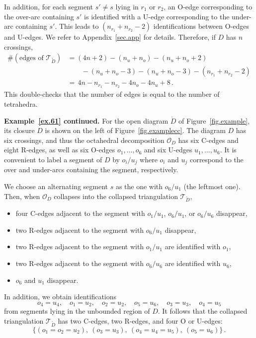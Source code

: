 \documentclass[12pt,reqno]{amsart}
\theoremstyle{definition}
\def\calO{\mathcal O}
\def\calT{\mathcal T}
\renewcommand{\Ddot}{\mathring{D}}
\begin{document}
In addition, for each segment $s' \neq s$ lying in $r_1$ or $r_2$, an O-edge
corresponding to the over-arc containing $s'$ is identified with a U-edge
corresponding to the under-arc containing $s'$. This leads to
$(n_{r_1}+n_{r_2}-2)$ identifications between O-edges and U-edges. 
We refer to Appendix~\ref{sec.app} for details.  Therefore, if $D$ has $n$
crossings, 
\begin{align*}
\# ( \textrm{edges of } \calT_{\Ddot}) &= (4n + 2) - (n_u + n_o) - (n_u + n_o +2) \\
 & \quad \quad - (n_u + n _o -3) - (n_u + n _o -3) - (n_{r_1} + n_{r_2} -2 ) \\
&=  \, 4n  - n_{r_1} - n_{r_2}-4n_o -4n_u + 8 \, .
\end{align*}
This double-checks that the number of edges is equal to the number of tetrahedra.

\noindent
{\bf Example~\ref{ex.61} continued.} For the open diagram $\Ddot$ of
Figure~\ref{fig.example}, its closure $D$ is shown on the left of
Figure~\ref{fig.examplecc}. The diagram $D$ has six crossings, and thus the octahedral
decomposition $\calO_D$ has
six C-edges and eight R-edges, as well as six O-edges $o_1,\ldots,o_6$ and six
U-edges $u_1,\ldots , u_6$. It is convenient to label a segment of $D$
by $o_i/u_j$ where $o_i$ and $u_j$ correspond to the over and under-arcs containing
the segment, respectively.

We choose an alternating segment $s$ as the one with $o_6/u_1$ (the leftmost one).
Then, when $\calO_D$ collapses into the collapsed triangulation $\calT_{\Ddot}$,
\begin{itemize}
\item
  four C-edges adjacent to the segment with $o_1/u_1$, $o_6/u_1$, or $o_6/u_6$ disappear,
\item
  two R-edges adjacent to the segment with $o_6/u_1$ disappear,
\item
  two R-edges adjacent to the segment with $o_1/u_1$ are identified with $o_1$,
\item
  two R-edges adjacent to the segment with $o_6/u_6$ are identified with $u_6$,
\item $o_6$ and $u_1$ disappear.
\end{itemize} 
In addition, we obtain identifications
\begin{equation*}
  o_4 = u_4, \quad o_1 = u_2, \quad  o_2=u_2, \quad  o_5 = u_6,
  \quad o_3 = u_3, \quad o_4=u_5
\end{equation*}
from segments lying in the unbounded region of $D$.
It follows that the collapsed triangulation $\calT_{\Ddot}$ has two C-edges,
two R-edges, and four O or U-edges:
\begin{equation*}
\{(o_1 = o_2 = u_2), \ (o_3 = u_3), \ (o_4=u_4=u_5), \ (o_5 = u_6) \} \,.
\end{equation*}
\end{document}
